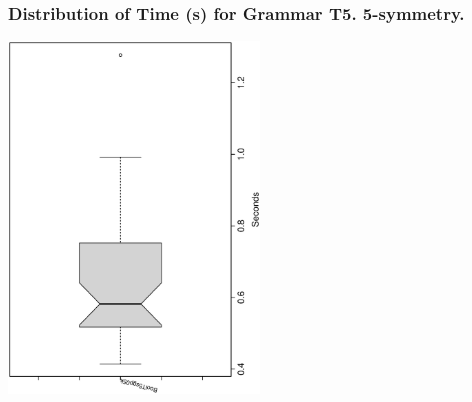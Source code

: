  \begin{frame}
 \frametitle{ Distribution of Time (s) for Grammar T5. 5-symmetry. }
 \begin{center}
\includegraphics[width=0.5\textwidth, angle=-90]
{ExpFboxplottSeconds003.eps}
 \end{center}
 \label{ExpFboxplottSeconds003.eps}  
 \end{frame}

